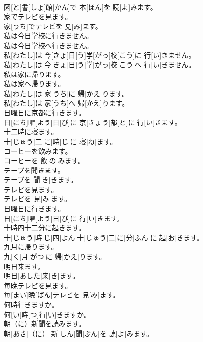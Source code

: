 \documentclass[8pt]{extreport}
\begin{document}
\begin{CJK}{UTF8}{min}
\\	図[と]書[しょ]館[かん]で 本[ほん]を 読[よ]みます。
\\	家でテレビを見ます。	
\\	家[うち]でテレビを 見[み]ます。
\\	私は今日学校に行きません。 
\\	私は今日学校へ行きません。	
\\	私[わたし]は 今[きょ]日[う]学[がっ]校[こう]に 行[い]きません。 
\\	私[わたし]は 今[きょ]日[う]学[がっ]校[こう]へ 行[い]きません。
\\	私は家に帰ります。 
\\	私は家へ帰ります。	
\\	私[わたし]は 家[うち]に 帰[かえ]ります。 
\\	私[わたし]は 家[うち]へ 帰[かえ]ります。
\\	日曜日に京都に行きます。	
\\	日[にち]曜[よう]日[び]に 京[きょう]都[と]に 行[い]きます。
\\	十二時に寝ます。	
\\	十[じゅう]二[に]時[じ]に 寝[ね]ます。
\\	コーヒーを飲みます。	
\\	コーヒーを 飲[の]みます。
\\	テープを聞きます。	
\\	テープを 聞[き]きます。
\\	テレビを見ます。	
\\	テレビを 見[み]ます。
\\	日曜日に行きます。	
\\	日[にち]曜[よう]日[び]に 行[い]きます。
\\	十時四十二分に起きます。	
\\	十[じゅう]時[じ]四[よん]十[じゅう]二[に]分[ふん]に 起[お]きます。
\\	九月に帰ります。	
\\	九[く]月[がつ]に 帰[かえ]ります。
\\	明日来ます。	
\\	明日[あした]来[き]ます。
\\	毎晩テレビを見ます。	
\\	毎[まい]晩[ばん]テレビを 見[み]ます。
\\	何時行きますか。	
\\	何[い]時[つ]行[い]きますか。
\\	朝（に）新聞を読みます。	
\\	朝[あさ]（に） 新[しん]聞[ぶん]を 読[よ]みます。

\end{CJK}
\end{document}
